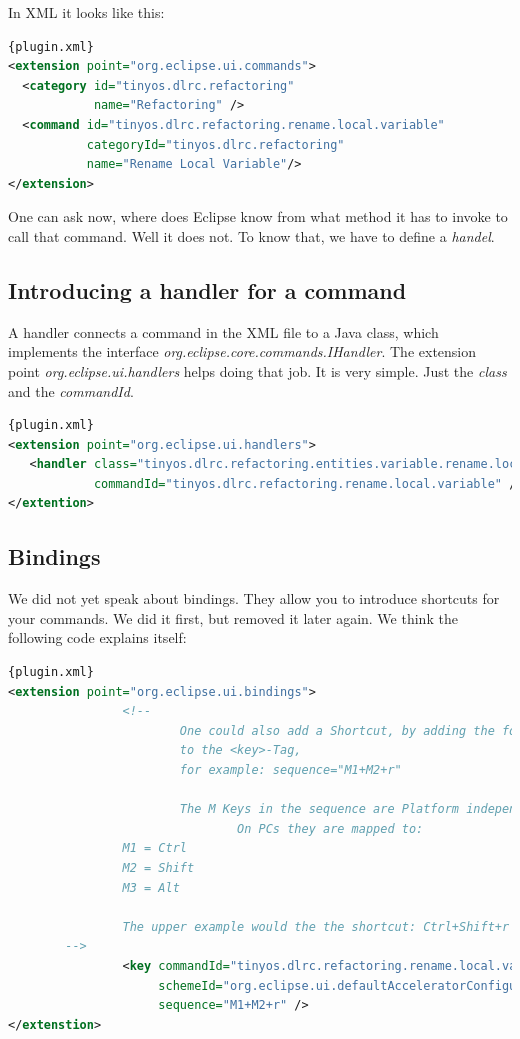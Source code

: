 \documentclass[a4paper,10pt]{report}
\begin{document}
In XML it looks like this:
\begin{lstlisting}[language=XML,caption=Creating a command ({\it plugin.xml})]{plugin.xml}
<extension point="org.eclipse.ui.commands">
  <category id="tinyos.dlrc.refactoring"
            name="Refactoring" />
  <command id="tinyos.dlrc.refactoring.rename.local.variable"
           categoryId="tinyos.dlrc.refactoring"
           name="Rename Local Variable"/>
</extension>
\end{lstlisting}

One can ask now, where does Eclipse know from what method it has to invoke to call that command.
Well it does not. To know that, we have to define a {\it handel}.

\subsection{Introducing a handler for a command}
\label{commandHandler}
A handler connects a command in the XML file to a Java class, which implements the interface {\it org.eclipse.core.commands.IHandler}.
The extension point {\it org.eclipse.ui.handlers} helps doing that job. It is very simple. Just the {\it class} and the {\it commandId}.
\begin{lstlisting}[language=XML,caption=Connecting a command to a handler ({\it plugin.xml})]{plugin.xml}
<extension point="org.eclipse.ui.handlers">
   <handler class="tinyos.dlrc.refactoring.entities.variable.rename.local.RenameLocalVariableActionHandler"
            commandId="tinyos.dlrc.refactoring.rename.local.variable" />
</extention>
\end{lstlisting}

\subsection{Bindings}
We did not yet speak about bindings. They allow you to introduce shortcuts for your commands. We did it first, but removed it later again.
We think the following code explains itself:
\begin{lstlisting}[language=XML,caption=Introduce shortcuts ({\it plugin.xml})]{plugin.xml}
<extension point="org.eclipse.ui.bindings">
                <!--
                        One could also add a Shortcut, by adding the following Attribute
                        to the <key>-Tag,
                        for example: sequence="M1+M2+r"

                        The M Keys in the sequence are Platform independent keys.
                                On PCs they are mapped to:
                M1 = Ctrl
                M2 = Shift
                M3 = Alt

                The upper example would the the shortcut: Ctrl+Shift+r
		-->
                <key commandId="tinyos.dlrc.refactoring.rename.local.variable"
                     schemeId="org.eclipse.ui.defaultAcceleratorConfiguration"
                     sequence="M1+M2+r" />
</extenstion>
\end{lstlisting}
\end{document}
